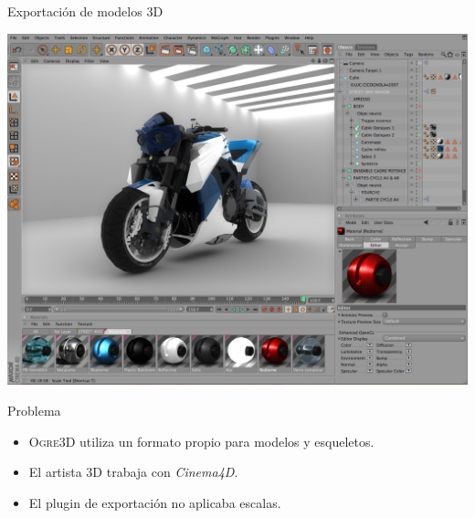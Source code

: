 \documentclass[green]{beamer}
\begin{document}
\begin{frame}{Exportación de modelos 3D}
    
    \begin{center}
	\includegraphics[scale=0.13]{img/cinema4d-moto.jpg}
    \end{center}
    
    \begin{alertblock}{Problema}
	\begin{itemize}
	    \item \textsc{Ogre3D} utiliza un formato propio para modelos y esqueletos.
	    \item El artista 3D trabaja con \textit{Cinema4D}.
	    \item El plugin de exportación no aplicaba escalas.
	\end{itemize}
    \end{alertblock}
\end{frame}
\end{document}
